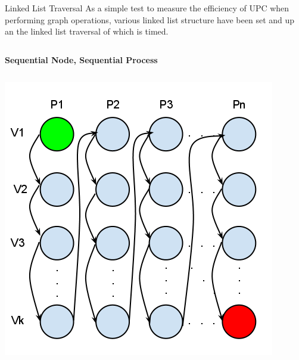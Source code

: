 \documentclass[final]{beamer}
\begin{document}
\begin{frame}[t]
\begin{columns}[t]
\begin{column}{0.60\paperwidth}
				\begin{block}{Linked List Traversal}
					As a simple test to measure the efficiency of UPC when performing graph operations, various linked list structure have been set and up an the linked list traversal of which is timed.  
				\end{block}
				\begin{columns}[t,totalwidth=0.60\paperwidth]
					\begin{column}{0.28\paperwidth}
						\begin{center} \bf{Sequential Node, Sequential Process} \end{center}
						\begin{columns}[t,totalwidth=0.28\paperwidth]
							\begin{column}{0.12\paperwidth}
								\begin{center} \includegraphics[width=0.12\paperwidth]{img/linked_list/seq_node_seq_proc} \end{center}
							\end{column}
							\begin{column}{0.12\paperwidth}

\end{column}
\end{columns}
\end{column}
\end{columns}
\end{column}
\end{columns}
\end{frame}
\end{document}
